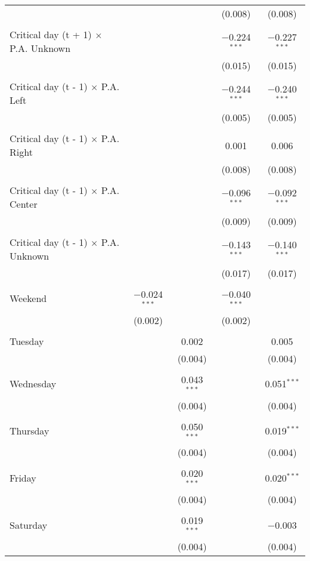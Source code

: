 \documentclass[
]{article}
\begin{document}
\begin{table}[!htbp]
{\begin{tabular}{@{\extracolsep{5pt}}lcccc}
  &  &  & (0.008) & (0.008) \\ 
  & & & & \\ 
 Critical day (t + 1) $\times$ P.A. Unknown &  &  & $-$0.224$^{***}$ & $-$0.227$^{***}$ \\ 
  &  &  & (0.015) & (0.015) \\ 
  & & & & \\ 
 Critical day (t - 1) $\times$ P.A. Left &  &  & $-$0.244$^{***}$ & $-$0.240$^{***}$ \\ 
  &  &  & (0.005) & (0.005) \\ 
  & & & & \\ 
 Critical day (t - 1) $\times$ P.A. Right &  &  & 0.001 & 0.006 \\ 
  &  &  & (0.008) & (0.008) \\ 
  & & & & \\ 
 Critical day (t - 1) $\times$ P.A. Center &  &  & $-$0.096$^{***}$ & $-$0.092$^{***}$ \\ 
  &  &  & (0.009) & (0.009) \\ 
  & & & & \\ 
 Critical day (t - 1) $\times$ P.A. Unknown &  &  & $-$0.143$^{***}$ & $-$0.140$^{***}$ \\ 
  &  &  & (0.017) & (0.017) \\ 
  & & & & \\ 
 Weekend & $-$0.024$^{***}$ &  & $-$0.040$^{***}$ &  \\ 
  & (0.002) &  & (0.002) &  \\ 
  & & & & \\ 
 Tuesday &  & 0.002 &  & 0.005 \\ 
  &  & (0.004) &  & (0.004) \\ 
  & & & & \\ 
 Wednesday &  & 0.043$^{***}$ &  & 0.051$^{***}$ \\ 
  &  & (0.004) &  & (0.004) \\ 
  & & & & \\ 
 Thursday &  & 0.050$^{***}$ &  & 0.019$^{***}$ \\ 
  &  & (0.004) &  & (0.004) \\ 
  & & & & \\ 
 Friday &  & 0.020$^{***}$ &  & 0.020$^{***}$ \\ 
  &  & (0.004) &  & (0.004) \\ 
  & & & & \\ 
 Saturday &  & 0.019$^{***}$ &  & $-$0.003 \\ 
  &  & (0.004) &  & (0.004) \\ 

\end{tabular}}
\end{table}
\end{document}
